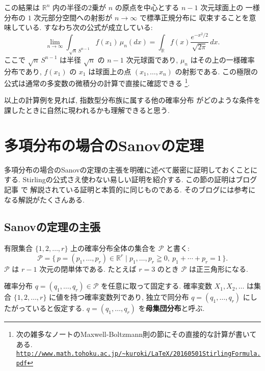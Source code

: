 \documentclass[12pt,twoside]{jarticle}
\newcommand\R{{\mathbb R}} %
\newcommand\cP{{\mathcal P}}
\theoremstyle{definition} %
\theoremstyle{definition} %
\theoremstyle{definition} %
\numberwithin{theorem}{section}
\numberwithin{equation}{section}
\numberwithin{figure}{section}
\numberwithin{table}{section}
\begin{document}
この結果は $\R^n$ 内の半径の2乗が $n$ の原点を中心とする $n-1$ 次元球面上の
一様分布の $1$ 次元部分空間への射影が $n\to\infty$ で標準正規分布に
収束することを意味している. すなわち次の公式が成立している:
\[
\lim_{n\to\infty}\int_{\sqrt{n}\,S^{n-1}} f(x_1)\,\mu_n(dx)
=\int_\R f(x)\frac{e^{-x^2/2}}{\sqrt{2\pi}}\,dx.
\]
ここで $\sqrt{n}\,S^{n-1}$ は半径 $\sqrt{n}$ の $n-1$ 次元球面であり, 
$\mu_n$ はその上の一様確率分布であり, 
$f(x_1)$ の $x_1$ は球面上の点 $(x_1,\ldots,x_n)$ の射影である.
この極限の公式は通常の多変数の微積分の計算で直接に確認できる%
\footnote{次の雑多なノートのMaxwell-Boltzmann則の節にその直接的な計算が書いてある. \\
\href{http://www.math.tohoku.ac.jp/~kuroki/LaTeX/20160501StirlingFormula.pdf}
{\tt http://www.math.tohoku.ac.jp/{\textasciitilde}kuroki/LaTeX/20160501StirlingFormula.pdf}}.

以上の計算例を見れば, 指数型分布族に属する他の確率分布
がどのような条件を課したときに自然に現われるかも理解できると思う.


\section{多項分布の場合のSanovの定理}
\label{sec:Sanov}

多項分布の場合のSanovの定理の主張を明確に述べて厳密に証明しておくことにする.
Stirlingの公式さえ使わない易しい証明を紹介する.
この節の証明はブログ記事 \cite{vanRamon2013} で
解説されている証明と本質的に同じものである.
そのブログには参考になる解説がたくさんある.


\subsection{Sanovの定理の主張}


有限集合 $\{1,2,\ldots,r\}$ 上の確率分布全体の集合を $\cP$ と書く:
\[
\cP = \{\,p=(p_1,\ldots,p_r)\in\R^r\mid p_1,\ldots,p_r\geqq 0,\ p_1+\cdots+p_r=1 \,\}.
\]
$\cP$ は $r-1$ 次元の閉単体である.
たとえば $r=3$ のとき $\cP$ は正三角形になる.

確率分布 $q=(q_1,\ldots,q_r)\in\cP$ を任意に取って固定する.
確率変数 $X_1,X_2,\ldots$ は集合 $\{1,2,\ldots,r\}$ に値を持つ確率変数列であり, 
独立で同分布 $q=(q_1,\ldots,q_r)$ にしたがっていると仮定する.
$q=(q_1,\ldots,q_r)$ を{\bf 母集団分布}と呼ぶ.
\end{document}
